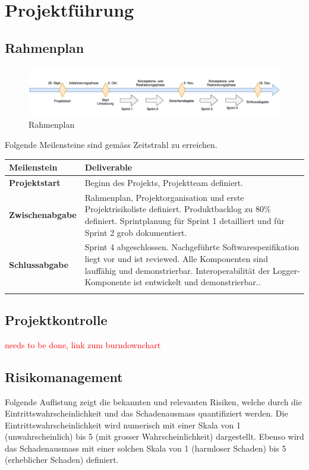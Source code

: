 \section{Projektführung}
\subsection{Rahmenplan}
\begin{figure}[H]
	\centering
	\includegraphics[width=\linewidth]{2_Projektfuehrung/Bilder/rahmenplan.png}
	\caption{Rahmenplan}
	\label{fig: Rahmenplan}
\end{figure}
Folgende Meilensteine sind gemäss Zeitstrahl zu erreichen.
\begin{center}
	\begin{tabularx}{\textwidth}{|X|X|}
		\hline
		\textbf{Meilenstein} & \textbf{Deliverable} \\
		\hline
		\textbf{Projektstart} & Beginn des Projekts, Projektteam definiert. \\
		\hline
		\textbf{Zwischenabgabe} & Rahmenplan, Projektorganisation und erste Projektrisikoliste definiert. Produktbacklog zu 80\% definiert. Sprintplanung für Sprint 1 detailliert und für Sprint 2 grob dokumentiert. \\
		\hline
		\textbf{Schlussabgabe} & Sprint 4 abgeschlossen. Nachgeführte Softwarespezifikation liegt vor und ist reviewed. Alle Komponenten sind lauffähig und demonstrierbar. Interoperabilität der Logger-Komponente ist entwickelt und demonstrierbar.. \\
		\hline
		\caption{Meilensteine}\label{meilensteine}\\
	\end{tabularx}
\end{center}
\subsection{Projektkontrolle}
\textcolor{red}{needs to be done, link zum burndownchart}
\newpage
\subsection{Risikomanagement}
Folgende Auflistung zeigt die bekannten und relevanten Risiken, welche durch die Eintrittswahrscheinlichkeit und das Schadenausmass quantifiziert werden. Die Eintrittswahrscheinlichkeit wird numerisch mit einer Skala von 1 (unwahrscheinlich) bis 5 (mit grosser Wahrscheinlichkeit) dargestellt. Ebenso wird das Schadenausmass mit einer solchen Skala von 1 (harmloser Schaden) bis 5 (erheblicher Schaden) definiert.

